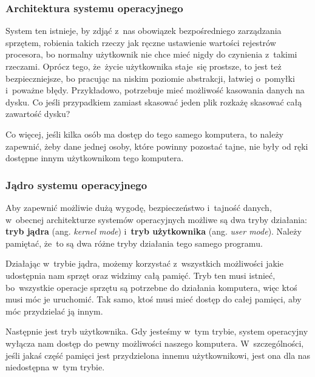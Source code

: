 \documentclass[10pt,t]{beamer}
\begin{document}
\begin{frame}
  \frametitle{Architektura systemu operacyjnego}


  System ten istnieje, by zdjąć z~nas obowiązek bezpośredniego zarządzania
  sprzętem, robienia takich rzeczy jak ręczne ustawienie wartości rejestrów
  procesora, bo normalny użytkownik nie chce mieć nigdy do czynienia
  z~takimi rzeczami. Oprócz tego, że~życie użytkownika staje~się prostsze,
  to jest też bezpieczniejsze, bo pracując na niskim poziomie abstrakcji,
  łatwiej o~pomyłki i~poważne błędy. Przykładowo, potrzebuje mieć możliwość
  kasowania danych na dysku. Co jeśli przypadkiem zamiast skasować jeden
  plik rozkażę skasować całą zawartość dysku?

  Co więcej, jeśli kilka osób ma dostęp do tego samego komputera, to
  należy zapewnić, żeby dane jednej osoby, które powinny pozostać tajne, nie
  były od ręki dostępne innym użytkownikom tego komputera.

\end{frame}





\begin{frame}
  \frametitle{Jądro systemu operacyjnego}


  Aby zapewnić możliwie dużą wygodę, bezpieczeństwo i~tajność danych,
  w~obecnej architekturze systemów operacyjnych możliwe są dwa tryby
  działania: \textbf{tryb jądra} (ang. \textit{kernel mode})
  i~\textbf{tryb użytkownika} (ang. \textit{user mode}). Należy pamiętać,
  że~to są dwa różne tryby działania tego samego programu.

  Działając w~trybie jądra, możemy korzystać z~wszystkich możliwości jakie
  udostępnia nam sprzęt oraz widzimy całą pamięć. Tryb ten musi istnieć,
  bo~wszystkie operacje sprzętu są potrzebne do działania komputera, więc
  ktoś musi móc je uruchomić. Tak samo, ktoś musi mieć dostęp do całej
  pamięci, aby móc przydzielać ją innym.

  Następnie jest tryb użytkownika. Gdy jesteśmy w~tym trybie, system
  operacyjny wyłącza nam dostęp do pewny możliwości naszego komputera.
  W~szczególności, jeśli jakaś część pamięci jest przydzielona innemu
  użytkownikowi, jest ona dla nas niedostępna w~tym trybie.

\end{frame}
\end{document}
